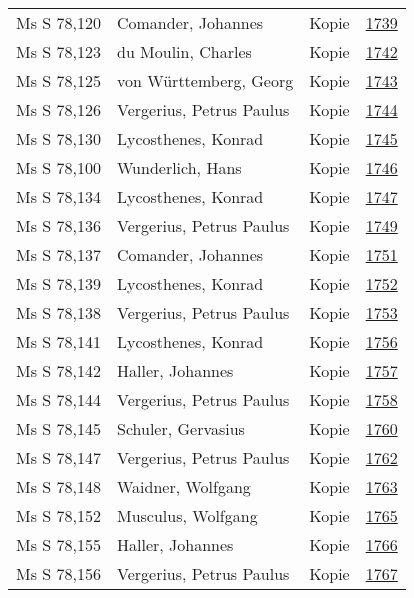 \documentclass[10pt,a4paper,landscape]{report}
\begin{document}
\begin{longtable}{p{16cm}p{4cm}lr}
Ms S 78,120	&	Comander, Johannes	&	Kopie	&	\href{http://130.60.24.72/assignment/1739}{1739}\\
Ms S 78,123	&	du Moulin, Charles	&	Kopie	&	\href{http://130.60.24.72/assignment/1742}{1742}\\
Ms S 78,125	&	von Württemberg, Georg	&	Kopie	&	\href{http://130.60.24.72/assignment/1743}{1743}\\
Ms S 78,126	&	Vergerius, Petrus Paulus	&	Kopie	&	\href{http://130.60.24.72/assignment/1744}{1744}\\
Ms S 78,130	&	Lycosthenes, Konrad	&	Kopie	&	\href{http://130.60.24.72/assignment/1745}{1745}\\
Ms S 78,100	&	Wunderlich, Hans	&	Kopie	&	\href{http://130.60.24.72/assignment/1746}{1746}\\
Ms S 78,134	&	Lycosthenes, Konrad	&	Kopie	&	\href{http://130.60.24.72/assignment/1747}{1747}\\
Ms S 78,136	&	Vergerius, Petrus Paulus	&	Kopie	&	\href{http://130.60.24.72/assignment/1749}{1749}\\
Ms S 78,137	&	Comander, Johannes	&	Kopie	&	\href{http://130.60.24.72/assignment/1751}{1751}\\
Ms S 78,139	&	Lycosthenes, Konrad	&	Kopie	&	\href{http://130.60.24.72/assignment/1752}{1752}\\
Ms S 78,138	&	Vergerius, Petrus Paulus	&	Kopie	&	\href{http://130.60.24.72/assignment/1753}{1753}\\
Ms S 78,141	&	Lycosthenes, Konrad	&	Kopie	&	\href{http://130.60.24.72/assignment/1756}{1756}\\
Ms S 78,142	&	Haller, Johannes	&	Kopie	&	\href{http://130.60.24.72/assignment/1757}{1757}\\
Ms S 78,144	&	Vergerius, Petrus Paulus	&	Kopie	&	\href{http://130.60.24.72/assignment/1758}{1758}\\
Ms S 78,145	&	Schuler, Gervasius	&	Kopie	&	\href{http://130.60.24.72/assignment/1760}{1760}\\
Ms S 78,147	&	Vergerius, Petrus Paulus	&	Kopie	&	\href{http://130.60.24.72/assignment/1762}{1762}\\
Ms S 78,148	&	Waidner, Wolfgang	&	Kopie	&	\href{http://130.60.24.72/assignment/1763}{1763}\\
Ms S 78,152	&	Musculus, Wolfgang	&	Kopie	&	\href{http://130.60.24.72/assignment/1765}{1765}\\
Ms S 78,155	&	Haller, Johannes	&	Kopie	&	\href{http://130.60.24.72/assignment/1766}{1766}\\
Ms S 78,156	&	Vergerius, Petrus Paulus	&	Kopie	&	\href{http://130.60.24.72/assignment/1767}{1767}\\

\end{longtable}
\end{document}
